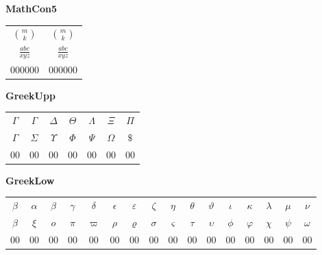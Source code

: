 \documentclass[12pt]{report}
\newlength{\mine}
\newlength{\niz}
\def\pmb{}
\begin{document}
\textbf{MathCon5}
\par\nobreak\vspace{2mm}
\begin{tabular}{|c|c|}
  \hline \rule{0pt}{7mm}
   $\pmb{\binom{m}{k}} $&
   $\pmb{\binom{m}{k}} $\\[\mine]
   $\pmb{\frac{abc}{xyz} }$&
   $\pmb{\frac{abc}{xyz} }$\\[\niz]
  \hline\hline
  000000&000000\\
  \hline
\end{tabular}
\goodbreak\par\vspace{3mm}

\newpage

\textbf{GreekUpp}
\par\nobreak\vspace{2mm}
\begin{tabular}{|c|cccccc|}
  \hline
   $\pmb\Gamma     $&
   $\pmb\Gamma     $&
   $\pmb\Delta     $&
   $\pmb\Theta     $&
   $\pmb\Lambda    $&
   $\pmb\Xi        $&
   $\pmb\Pi        $\\[\mine]
   $\pmb\Gamma     $&
   $\pmb\Sigma     $&
   $\pmb\Upsilon   $&
   $\pmb\Phi       $&
   $\pmb\Psi       $&
   $\pmb\Omega     $&
   $\pmb\$         $\\[\niz]
  \hline\hline
  00&00&00&00&00&00&00\\
  \hline
\end{tabular}
\goodbreak\par\vspace{3mm}

\textbf{GreekLow}
\par\nobreak\vspace{2mm}
\begin{tabular}{|c|ccccccccccccccc|}
  \hline
   $\pmb\beta      $&
   $\pmb\alpha     $&
   $\pmb\beta      $&
   $\pmb\gamma     $&
   $\pmb\delta     $&
   $\pmb\epsilon   $&
   $\pmb\varepsilon$&
   $\pmb\zeta      $&
   $\pmb\eta       $&
   $\pmb\theta     $&
   $\pmb\vartheta  $&
   $\pmb\iota      $&
   $\pmb\kappa     $&
   $\pmb\lambda    $&
   $\pmb\mu        $&
   $\pmb\nu        $\\[\mine]
   $\pmb\beta      $&
   $\pmb\xi        $&
   $\pmb o         $&
   $\pmb\pi        $&
   $\pmb\varpi     $&
   $\pmb\rho       $&
   $\pmb\varrho    $&
   $\pmb\sigma     $&
   $\pmb\varsigma  $&
   $\pmb\tau       $&
   $\pmb\upsilon   $&
   $\pmb\phi       $&
   $\pmb\varphi    $&
   $\pmb\chi       $&
   $\pmb\psi       $&
   $\pmb\omega     $\\[\niz]
  \hline\hline
  00&00&00&00&00&00&00&00&00&00&00&00&00&00&00&00\\
  \hline
\end{tabular}
\goodbreak\par\vspace{3mm}
\end{document}
